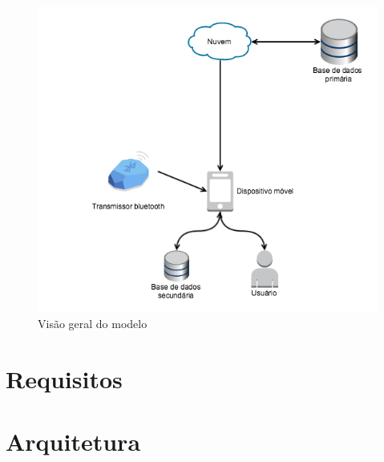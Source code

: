 \documentclass[english,brazilian]{UNISINOSmonografia}
\begin{document}
\FloatBarrier
\begin{figure}[!ht]
	\caption{Visão geral do modelo}
	\label{fig:blablabla}
	\centering%
	\begin{minipage}{.8\textwidth}
		\includegraphics[width=\textwidth]{escrita}
	\end{minipage}
\end{figure}
\FloatBarrier

	\section{Requisitos}

	\section{Arquitetura}
 
\end{document}
